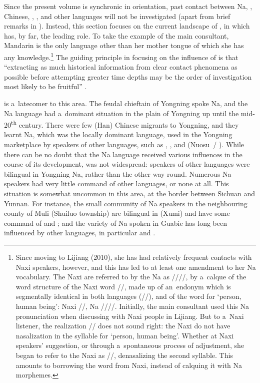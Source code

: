 Since the present volume is synchronic in orientation, past
contact between Na, , Chinese, , ,  and other
languages will not be investigated (apart from brief remarks in ). Instead, this section focuses
on the current landscape of , in which  has, by
far, the leading role. To take the example of the main consultant,
{Mandarin} is the only language other than her mother tongue of which she
has any knowledge.\footnote{Since moving to Lijiang (2010), she has had relatively frequent
	contacts with {Naxi} speakers, however, and this has led to at least one amendment to her Na vocabulary. The {Naxi} are
	referred to by the Na as ////, by a~calque of the word structure of the {Naxi} word //,
	made up of an~{endonym} which is segmentally identical in both languages (//), and of the word for
	‘person, human being’: {Naxi} //, Na ////. Initially, the main consultant used this Na pronunciation when
	discussing with {Naxi} people in Lijiang. But to a~{Naxi} listener, the realization // does not sound right:
	the {Naxi} do not have nasalization in the syllable for ‘person, human being’. Whether at {Naxi}
	speakers’ suggestion, or through a~spontaneous process of adjustment, she began to refer to the
	{Naxi} as //, denasalizing the second syllable. This amounts to borrowing the word from
	{Naxi}, instead of calquing it with Na morphemes.}
The guiding principle in focusing on the influence of  is that “extracting as much historical information from clear contact phenomena as possible before attempting greater time depths may be the order of investigation most likely to be fruitful” \citep[485]{souag2010}.

 is a~latecomer to this area. The feudal chieftain of Yongning
spoke Na, and the Na language had a~dominant situation in the plain of
Yongning up until the mid-20\textsuperscript{th} century. There were few (Han) Chinese
migrants to Yongning, and they learnt Na, which was the locally
dominant language, used in the Yongning marketplace by speakers
of other languages, such as , , and  ({Nuosu}~/ ). While
there can be no doubt that the Na language received various influences
in the course of its development,  was not widespread:
speakers of other languages were bilingual in Yongning Na, rather than the
other way round. Numerous Na speakers had very little command of other
languages, or none at all. This situation is somewhat uncommon in
this area, at the border between Sichuan and Yunnan. For instance, the
small community of Na speakers in the neighbouring county of Muli  (Shuiluo  township) are bilingual in  (Xumi) and have some command of
 and ; and the variety of Na spoken in Guabie  has long been
influenced by other languages, in particular  and .

